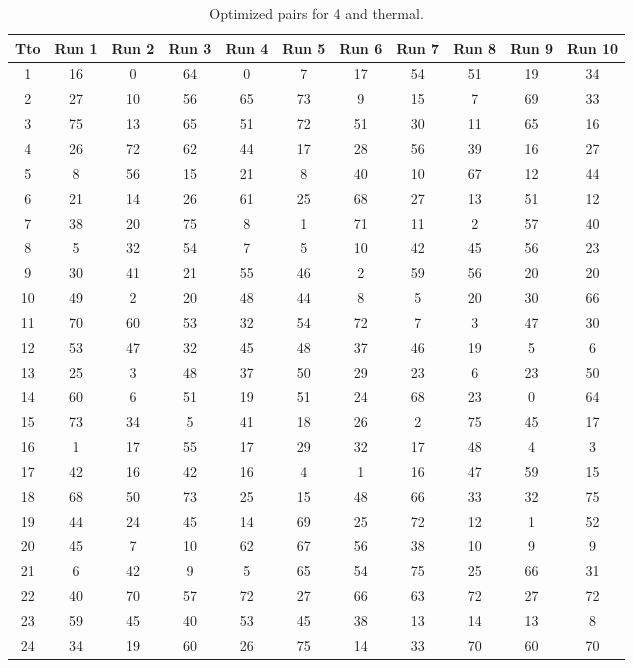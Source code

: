 \begin{table}
  \centering
  \scriptsize
  \caption{Optimized pairs for 4 and thermal.}
  \label{tab_pairs}
\begin{tabular}{c c c c c c c c c c c }
\hline
Tto & Run 1 & Run 2 & Run 3 & Run 4 & Run 5 & Run 6 & Run 7 & Run 8 & Run 9 & Run 10 \\
\hline
1 & 16 & 0 & 64 & 0 & 7 & 17 & 54 & 51 & 19 & 34 \\
2 & 27 & 10 & 56 & 65 & 73 & 9 & 15 & 7 & 69 & 33 \\
3 & 75 & 13 & 65 & 51 & 72 & 51 & 30 & 11 & 65 & 16 \\
4 & 26 & 72 & 62 & 44 & 17 & 28 & 56 & 39 & 16 & 27 \\
5 & 8 & 56 & 15 & 21 & 8 & 40 & 10 & 67 & 12 & 44 \\
6 & 21 & 14 & 26 & 61 & 25 & 68 & 27 & 13 & 51 & 12 \\
7 & 38 & 20 & 75 & 8 & 1 & 71 & 11 & 2 & 57 & 40 \\
8 & 5 & 32 & 54 & 7 & 5 & 10 & 42 & 45 & 56 & 23 \\
9 & 30 & 41 & 21 & 55 & 46 & 2 & 59 & 56 & 20 & 20 \\
10 & 49 & 2 & 20 & 48 & 44 & 8 & 5 & 20 & 30 & 66 \\
11 & 70 & 60 & 53 & 32 & 54 & 72 & 7 & 3 & 47 & 30 \\
12 & 53 & 47 & 32 & 45 & 48 & 37 & 46 & 19 & 5 & 6 \\
13 & 25 & 3 & 48 & 37 & 50 & 29 & 23 & 6 & 23 & 50 \\
14 & 60 & 6 & 51 & 19 & 51 & 24 & 68 & 23 & 0 & 64 \\
15 & 73 & 34 & 5 & 41 & 18 & 26 & 2 & 75 & 45 & 17 \\
16 & 1 & 17 & 55 & 17 & 29 & 32 & 17 & 48 & 4 & 3 \\
17 & 42 & 16 & 42 & 16 & 4 & 1 & 16 & 47 & 59 & 15 \\
18 & 68 & 50 & 73 & 25 & 15 & 48 & 66 & 33 & 32 & 75 \\
19 & 44 & 24 & 45 & 14 & 69 & 25 & 72 & 12 & 1 & 52 \\
20 & 45 & 7 & 10 & 62 & 67 & 56 & 38 & 10 & 9 & 9 \\
21 & 6 & 42 & 9 & 5 & 65 & 54 & 75 & 25 & 66 & 31 \\
22 & 40 & 70 & 57 & 72 & 27 & 66 & 63 & 72 & 27 & 72 \\
23 & 59 & 45 & 40 & 53 & 45 & 38 & 13 & 14 & 13 & 8 \\
24 & 34 & 19 & 60 & 26 & 75 & 14 & 33 & 70 & 60 & 70 \\

\end{tabular}
\end{table}
